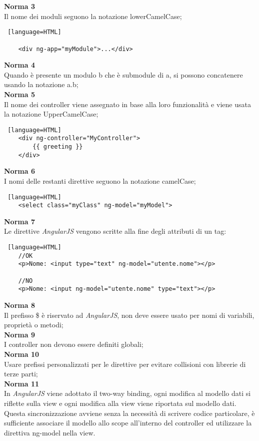 \textbf{Norma 3}\\
Il nome dei moduli seguono la notazione lowerCamelCase;
\begin{lstlisting} [language=HTML]
	
	<div ng-app="myModule">...</div>

\end{lstlisting}
\textbf{Norma 4}\\
Quando è presente un modulo b che è submodule di a, si possono concatenere usando la notazione a.b;\\
\textbf{Norma 5}\\
Il nome dei controller viene assegnato in base alla loro funzionalità e viene usata la notazione UpperCamelCase;
\begin{lstlisting} [language=HTML]
	<div ng-controller="MyController">
  		{{ greeting }}
	</div>
\end{lstlisting}
\textbf{Norma 6}\\
I nomi delle restanti direttive seguono la notazione camelCase;
\begin{lstlisting} [language=HTML]
	<select class="myClass" ng-model="myModel">
\end{lstlisting}
\textbf{Norma 7}\\
Le direttive \textit{AngularJS} vengono scritte alla fine degli attributi di un tag: 
\begin{lstlisting} [language=HTML]
	//OK
	<p>Nome: <input type="text" ng-model="utente.nome"></p>
	
	//NO
	<p>Nome: <input ng-model="utente.nome" type="text"></p>
\end{lstlisting}
\textbf{Norma 8}\\
Il prefisso \$ è riservato ad \textit{AngularJS}, non deve essere usato per nomi di variabili, proprietà o metodi;\\
\textbf{Norma 9}\\
I controller non devono essere definiti globali;\\
\textbf{Norma 10}\\
Usare prefissi personalizzati per le direttive per evitare collisioni con librerie di terze parti;\\
\textbf{Norma 11}\\
In \textit{AngularJS} viene adottato il two-way binding, ogni modifica al modello dati si riflette sulla view e ogni modifica alla view viene riportata sul modello dati.
Questa sincronizzazione avviene senza la necessità di scrivere codice particolare, è sufficiente associare il modello allo scope all'interno del controller ed utilizzare la direttiva ng-model nella view.


